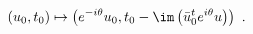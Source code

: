 \begin{equation*}
  (u_0,t_0) \mapsto \left(e^{-i\theta} u_0, t_0 - \im\left(\bar u_0^t
  e^{i\theta} u\right)\right)~.
\end{equation*}

